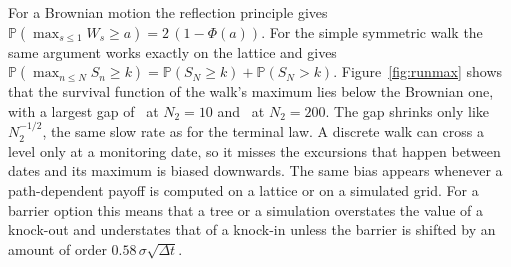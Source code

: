 For a Brownian motion the reflection principle gives $\mathbb P(\max_{s\le1}W_s\ge a)=2\,(1-\Phi(a))$.
For the simple symmetric walk the same argument works exactly on the lattice and gives $\mathbb P(\max_{n\le N}S_n\ge k)=\mathbb P(S_N\ge k)+\mathbb P(S_N>k)$.
Figure~\ref{fig:runmax} shows that the survival function of the walk's maximum lies below the Brownian one, with a largest gap of \MaxGapTen\ at $N_2=10$ and \MaxGapTwoHundred\ at $N_2=200$.
The gap shrinks only like $N_2^{-1/2}$, the same slow rate as for the terminal law.
A discrete walk can cross a level only at a monitoring date, so it misses the excursions that happen between dates and its maximum is biased downwards.
The same bias appears whenever a path-dependent payoff is computed on a lattice or on a simulated grid.
For a barrier option this means that a tree or a simulation overstates the value of a knock-out and understates that of a knock-in unless the barrier is shifted by an amount of order $0.58\,\sigma\sqrt{\Delta t}$.
